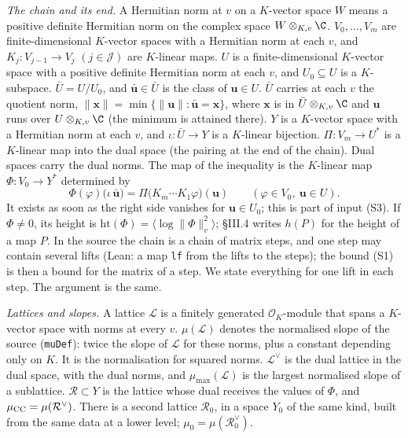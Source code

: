 \documentclass[11pt,letterpaper]{article}
\begin{document}
\emph{The chain and its end.} A Hermitian norm at $v$ on a $K$-vector space $W$ means a positive definite
Hermitian norm on the complex space $W\otimes_{K,v}\C$. $V_0,\dots,V_m$ are finite-dimensional $K$-vector spaces with a Hermitian
norm at each $v$, and $K_j:V_{j-1}\to V_j$ $(j\in\mathcal J)$ are $K$-linear maps. $U$ is a
finite-dimensional $K$-vector space with a positive definite Hermitian norm at each $v$, and
$U_0\subseteq U$ is a $K$-subspace. $\bar U=U/U_0$, and $\bar{\mathbf u}\in\bar U$ is the class of
$\mathbf u\in U$. $\bar U$ carries at each $v$ the quotient norm,
$\|\mathbf x\|=\min\{\|\mathbf u\|:\bar{\mathbf u}=\mathbf x\}$, where $\mathbf x$ is in $\bar U\otimes_{K,v}\C$ and $\mathbf u$ runs over $U\otimes_{K,v}\C$ (the minimum is attained there). $Y$ is a $K$-vector space with a
Hermitian norm at each $v$, and $\iota:\bar U\to Y$ is a $K$-linear bijection. $\Pi:V_m\to U^{*}$ is a
$K$-linear map into the dual space (the pairing at the end of the chain). Dual spaces carry the dual
norms. The map of the inequality is the $K$-linear map $\Phi:V_0\to Y^{*}$ determined by
\begin{equation}\label{sa:fact}
 \Phi(\varphi)\big(\iota\,\bar{\mathbf u}\big)=\Pi\big(K_m\cdots K_1\varphi\big)(\mathbf u)
 \qquad(\varphi\in V_0,\ \mathbf u\in U).
\end{equation}
It exists as soon as the right side vanishes for $\mathbf u\in U_0$; this is part of input (S3). If
$\Phi\ne0$, its height is $\mathrm{ht}(\Phi)=\langle\log\|\Phi\|_v^2\rangle$; \S III.4 writes $h(P)$ for
the height of a map $P$. In the source the chain is a chain of matrix steps, and one step may contain
several lifts (Lean: a map \texttt{lf} from the lifts to the steps); the bound (S1) is then a bound for
the matrix of a step. We state everything for one lift in each step. The argument is the same.

\emph{Lattices and slopes.} A lattice $\mathcal L$ is a finitely generated $\mathcal O_K$-module that
spans a $K$-vector space with norms at every $v$. $\mu(\mathcal L)$ denotes the normalised slope of the
source (\texttt{muDef}): twice the slope of $\mathcal L$ for these norms, plus a constant depending only
on $K$. It is the normalisation for squared norms. $\mathcal L^\vee$ is the dual lattice in the dual
space, with the dual norms, and $\mu_{\max}(\mathcal L)$ is the largest normalised slope of a sublattice.
$\mathcal R\subset Y$ is the lattice whose dual receives the values of $\Phi$, and
$\mu_{\rm CC}=\mu(\mathcal R^\vee)$. There is a second lattice $\mathcal R_0$, in a space $Y_0$ of the
same kind, built from the same data at a lower level; $\mu_0=\mu(\mathcal R_0^\vee)$.
\end{document}
